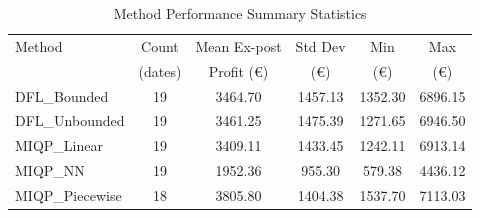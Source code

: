 \begin{table}[h]
\centering
\caption{Method Performance Summary Statistics}
\label{tab:method_summary}
\begin{tabular}{lccccc}
\toprule
Method & Count & Mean Ex-post & Std Dev & Min & Max \\
 & (dates) & Profit (€) & (€) & (€) & (€) \\
\midrule
DFL\_Bounded & 19 & 3464.70 & 1457.13 & 1352.30 & 6896.15 \\
DFL\_Unbounded & 19 & 3461.25 & 1475.39 & 1271.65 & 6946.50 \\
MIQP\_Linear & 19 & 3409.11 & 1433.45 & 1242.11 & 6913.14 \\
MIQP\_NN & 19 & 1952.36 & 955.30 & 579.38 & 4436.12 \\
MIQP\_Piecewise & 18 & 3805.80 & 1404.38 & 1537.70 & 7113.03 \\
\bottomrule
\end{tabular}
\end{table}
